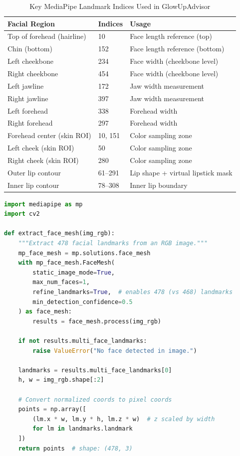\documentclass[12pt,a4paper]{article}
\begin{document}
\begin{table}[H]
\centering
\caption{Key MediaPipe Landmark Indices Used in GlowUpAdvisor}
\begin{tabular}{@{}l l p{6cm}@{}}
\toprule
\textbf{Facial Region} & \textbf{Indices} & \textbf{Usage} \\
\midrule
Top of forehead (hairline) & 10 & Face length reference (top) \\
Chin (bottom) & 152 & Face length reference (bottom) \\
Left cheekbone & 234 & Face width (cheekbone level) \\
Right cheekbone & 454 & Face width (cheekbone level) \\
Left jawline & 172 & Jaw width measurement \\
Right jawline & 397 & Jaw width measurement \\
Left forehead & 338 & Forehead width \\
Right forehead & 297 & Forehead width \\
Forehead center (skin ROI) & 10, 151 & Color sampling zone \\
Left cheek (skin ROI) & 50 & Color sampling zone \\
Right cheek (skin ROI) & 280 & Color sampling zone \\
Outer lip contour & 61--291 & Lip shape + virtual lipstick mask \\
Inner lip contour & 78--308 & Inner lip boundary \\
\bottomrule
\end{tabular}
\end{table}

\begin{lstlisting}[language=Python, caption={MediaPipe Face Mesh Extraction}]
import mediapipe as mp
import cv2

def extract_face_mesh(img_rgb):
    """Extract 478 facial landmarks from an RGB image."""
    mp_face_mesh = mp.solutions.face_mesh
    with mp_face_mesh.FaceMesh(
        static_image_mode=True,
        max_num_faces=1,
        refine_landmarks=True,  # enables 478 (vs 468) landmarks
        min_detection_confidence=0.5
    ) as face_mesh:
        results = face_mesh.process(img_rgb)
        
    if not results.multi_face_landmarks:
        raise ValueError("No face detected in image.")
    
    landmarks = results.multi_face_landmarks[0]
    h, w = img_rgb.shape[:2]
    
    # Convert normalized coords to pixel coords
    points = np.array([
        (lm.x * w, lm.y * h, lm.z * w)  # z scaled by width
        for lm in landmarks.landmark
    ])
    return points  # shape: (478, 3)
\end{lstlisting}
\end{document}
